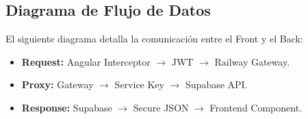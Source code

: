\documentclass[12pt,a4paper]{article}
\begin{document}
\subsection{Diagrama de Flujo de Datos}
El siguiente diagrama detalla la comunicación entre el Front y el Back:
\begin{itemize}
    \item \textbf{Request:} Angular Interceptor $\rightarrow$ JWT $\rightarrow$ Railway Gateway.
    \item \textbf{Proxy:} Gateway $\rightarrow$ Service Key $\rightarrow$ Supabase API.
    \item \textbf{Response:} Supabase $\rightarrow$ Secure JSON $\rightarrow$ Frontend Component.
\end{itemize}
\end{document}
